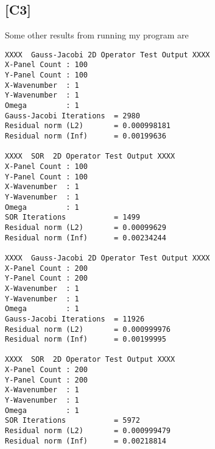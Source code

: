 \documentclass[12pt,a4paper]{article}
\newcommand{\bbu}{\blacktriangleright}
\begin{document}
\subsection*{[C3]} 
Some other results from running my program are
\\
\begin{center}\red{\large $\bbu$ increasing mesh size $\blacktriangleleft$}\end{center}
\begin{verbatim}
XXXX  Gauss-Jacobi 2D Operator Test Output XXXX 
X-Panel Count : 100
Y-Panel Count : 100
X-Wavenumber  : 1
Y-Wavenumber  : 1
Omega         : 1
Gauss-Jacobi Iterations  = 2980
Residual norm (L2)       = 0.000998181
Residual norm (Inf)      = 0.00199636

XXXX  SOR  2D Operator Test Output XXXX 
X-Panel Count : 100
Y-Panel Count : 100
X-Wavenumber  : 1
Y-Wavenumber  : 1
Omega         : 1
SOR Iterations           = 1499
Residual norm (L2)       = 0.00099629
Residual norm (Inf)      = 0.00234244

XXXX  Gauss-Jacobi 2D Operator Test Output XXXX 
X-Panel Count : 200
Y-Panel Count : 200
X-Wavenumber  : 1
Y-Wavenumber  : 1
Omega         : 1
Gauss-Jacobi Iterations  = 11926
Residual norm (L2)       = 0.000999976
Residual norm (Inf)      = 0.00199995

XXXX  SOR  2D Operator Test Output XXXX 
X-Panel Count : 200
Y-Panel Count : 200
X-Wavenumber  : 1
Y-Wavenumber  : 1
Omega         : 1
SOR Iterations           = 5972
Residual norm (L2)       = 0.000999479
Residual norm (Inf)      = 0.00218814
\end{verbatim}
\end{document}

